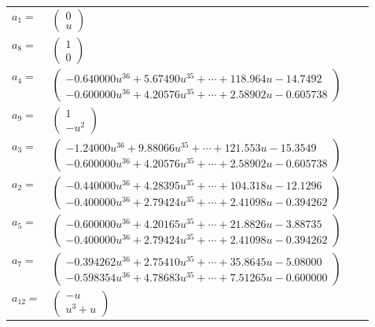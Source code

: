 \documentclass[1p]{elsarticle_modified}
\theoremstyle{definition}
\begin{document}
\begin{tabular}{m{7pt} m{180pt} m{7pt} m{180pt} }
\flushright $a_{1}=$&$\begin{pmatrix}0\\u\end{pmatrix}$ \\
\flushright $a_{8}=$&$\begin{pmatrix}1\\0\end{pmatrix}$ \\
\flushright $a_{4}=$&$\begin{pmatrix}-0.640000 u^{36}+5.67490 u^{35}+\cdots+118.964 u-14.7492\\-0.600000 u^{36}+4.20576 u^{35}+\cdots+2.58902 u-0.605738\end{pmatrix}$ \\
\flushright $a_{9}=$&$\begin{pmatrix}1\\- u^2\end{pmatrix}$ \\
\flushright $a_{3}=$&$\begin{pmatrix}-1.24000 u^{36}+9.88066 u^{35}+\cdots+121.553 u-15.3549\\-0.600000 u^{36}+4.20576 u^{35}+\cdots+2.58902 u-0.605738\end{pmatrix}$ \\
\flushright $a_{2}=$&$\begin{pmatrix}-0.440000 u^{36}+4.28395 u^{35}+\cdots+104.318 u-12.1296\\-0.400000 u^{36}+2.79424 u^{35}+\cdots+2.41098 u-0.394262\end{pmatrix}$ \\
\flushright $a_{5}=$&$\begin{pmatrix}-0.600000 u^{36}+4.20165 u^{35}+\cdots+21.8826 u-3.88735\\-0.400000 u^{36}+2.79424 u^{35}+\cdots+2.41098 u-0.394262\end{pmatrix}$ \\
\flushright $a_{7}=$&$\begin{pmatrix}-0.394262 u^{36}+2.75410 u^{35}+\cdots+35.8645 u-5.08000\\-0.598354 u^{36}+4.78683 u^{35}+\cdots+7.51265 u-0.600000\end{pmatrix}$ \\
\flushright $a_{12}=$&$\begin{pmatrix}- u\\u^3+u\end{pmatrix}$ \\

\end{tabular}
\end{document}

